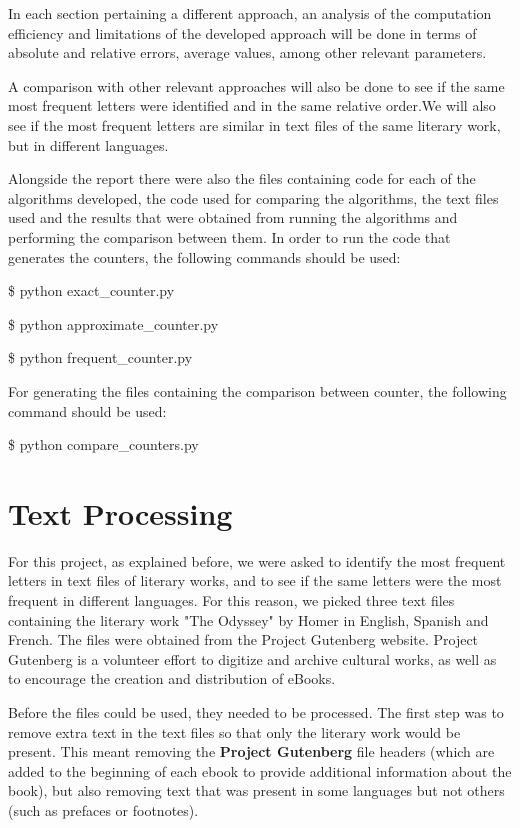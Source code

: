 \documentclass[]{revdetua}
\begin{document}
In each section pertaining a different approach, an analysis of the computation efficiency and limitations of the developed approach will be done in terms of absolute and relative errors, average values, among other relevant parameters. 

A comparison with other relevant approaches will also be done to see if the same most frequent letters were identified and in the same relative order.We will also see if the most frequent letters are similar in text files of the same literary work, but in different languages.

Alongside the report there were also the files containing code for each of the algorithms developed, the code used for comparing the algorithms, the text files used and the results that were obtained from running the algorithms and performing the comparison between them. In order to run the code that generates the counters, the following commands should be used:

\$ python exact\_counter.py 

\$ python approximate\_counter.py

\$ python frequent\_counter.py

For generating the files containing the comparison between counter, the following command should be used:

\$ python compare\_counters.py 

\section{Text Processing}

For this project, as explained before, we were asked to identify the most frequent letters in text files of literary works, and to see if the same letters were the most frequent in different languages. For this reason, we picked three text files containing the literary work "The Odyssey" by Homer in English, Spanish and French. The files were obtained from the Project Gutenberg website. Project Gutenberg is a volunteer effort to digitize and archive cultural works, as well as to encourage the creation and distribution of eBooks.

Before the files could be used, they needed to be processed. The first step was to remove extra text in the text files so that only the literary work would be present. This meant removing the \textbf{Project Gutenberg} file headers (which are added to the beginning of each ebook to provide additional information about the book), but also removing text that was present in some languages but not others (such as prefaces or footnotes). 
\end{document}
